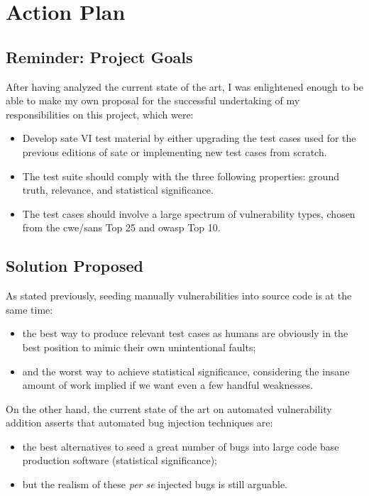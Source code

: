\section{Action Plan}
\label{sec:action-plan}

\subsection{Reminder: Project Goals}

After having analyzed the current state of the art, I was enlightened enough to be able to make my own proposal for the successful undertaking of my responsibilities on this project, which were:

\begin{itemize}
    \item Develop \gls{sate} VI test material by either upgrading the test cases used for the previous editions of \gls{sate} or implementing new test cases from scratch.
    \item The test suite should comply with the three following properties: ground truth, relevance, and statistical significance.
    \item The test cases should involve a large spectrum of vulnerability types, chosen from the \gls{cwe}/\acrshort{sans} Top 25 and \gls{owasp} Top 10.
\end{itemize}

\subsection{Solution Proposed}

As stated previously, seeding manually vulnerabilities into source code is at the same time:

\begin{itemize}
    \item[\textcolor{custom-green}{\ding{51}}] the best way to produce relevant test cases as humans are obviously in the best position to mimic their own unintentional faults;
    \item[\textcolor{custom-red}{\ding{55}}] and the worst way to achieve statistical significance, considering the insane amount of work implied if we want even a few handful weaknesses.
\end{itemize}

On the other hand, the current state of the art on automated vulnerability addition asserts that automated bug injection techniques are:

\begin{itemize}
    \item[\textcolor{custom-green}{\ding{51}}] the best alternatives to seed a great number of bugs into large code base production software (statistical significance);
    \item[\textcolor{custom-red}{\ding{55}}] but the realism of these \emph{per se} injected bugs is still arguable.
\end{itemize}

